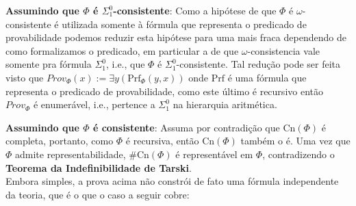 \documentclass[11pt]{article}
\begin{document}
\begin{shaded}
\textbf{Assumindo que $\Phi$ é $\Sigma_1^0$-consistente}: Como a hipótese de que $\Phi$ é $\omega$-consistente é utilizada somente à fórmula que representa o predicado de provabilidade podemos reduzir esta hipótese para uma mais fraca dependendo de como formalizamos o predicado, em particular a de que $\omega$-consistencia vale somente pra fórmula $\Sigma_1^0$, i.e., que $\Phi$ é $\Sigma_1^0$-consistente. Tal redução pode ser feita visto que $Prov_\Phi(x):=\exists y(\text{Prf}_\Phi(y,x))$ onde $\text{Prf}$ é uma fórmula que representa o predicado de provabilidade, como este último é recursivo então $Prov_\Phi$ é enumerável, i.e., pertence a $\Sigma_1^0$ na hierarquia aritmética.

\textbf{Assumindo que $\Phi$ é consistente}: Assuma por contradição que $\text{Cn}(\Phi)$ é completa, portanto, como $\Phi$ é recursiva, então $\text{Cn}(\Phi)$ também o é. Uma vez que $\Phi$ admite representabilidade, $\#\text{Cn}(\Phi)$ é representável em $\Phi$, contradizendo o \textbf{Teorema da Indefinibilidade de Tarski}.\\
Embora simples, a prova acima não constrói de fato uma fórmula independente da teoria, que é o que o caso a seguir cobre:


\end{shaded}
\end{document}
